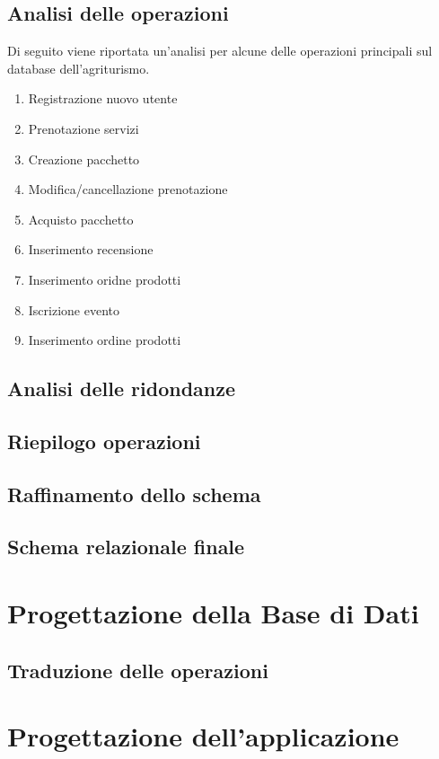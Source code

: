 \documentclass[a4paper,11pt]{report}
\begin{document}
\section{Analisi delle operazioni}
Di seguito viene riportata un'analisi per alcune delle operazioni principali sul database dell'agriturismo.

\begin{enumerate}
	\item Registrazione nuovo utente
	\item Prenotazione servizi
	\item Creazione pacchetto
	\item Modifica/cancellazione prenotazione
	\item Acquisto pacchetto
	\item Inserimento recensione
	\item Inserimento oridne prodotti
	\item Iscrizione evento
	\item Inserimento ordine prodotti
\end{enumerate}

\section{Analisi delle ridondanze}

\section{Riepilogo operazioni}

\section{Raffinamento dello schema}

\section{Schema relazionale finale}

\chapter{Progettazione della Base di Dati}
\section{Traduzione delle operazioni}

\chapter{Progettazione dell'applicazione}
\end{document}
